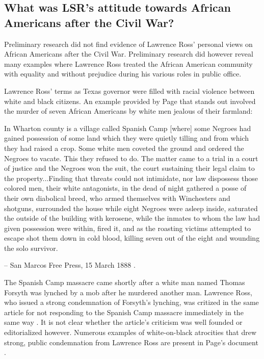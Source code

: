 \documentclass[12pt]{article}
\begin{document}
\newpage
\subsection{What was LSR's attitude towards African Americans after the Civil War?}
Preliminary research did not find evidence of Lawrence Ross' personal views on African Americans after the Civil War. Preliminary research did however reveal many examples where Lawrence Ross treated the African American community with equality and without prejudice during his various roles in public office. 

Lawrence Ross' terms as Texas governor were filled with racial violence between white and black citizens. An example provided by Page that stands out involved the murder of seven African Americans by white men jealous of their farmland:
\begin{displayquote}
In Wharton county is a village called Spanish Camp [where] some Negroes had gained possession of some land which they were quietly tilling and from which they had raised a crop. Some white men coveted the ground and ordered the Negroes to vacate.  This they refused to do. The matter came to a trial in a court of justice and the Negroes won the suit, the court sustaining their legal claim to the property...Finding that threats could not intimidate, nor law dispossess those colored men, their white antagonists, in the dead of night gathered a posse of their own diabolical breed, who armed themselves with Winchesters and shotguns, surrounded the house while eight Negroes were asleep inside, saturated the outside of the building with kerosene, while the inmates to whom the law had given possession were within, fired it, and as the roasting victims attempted to escape shot them down in cold blood, killing seven out of the eight and wounding the solo survivor.

-- San Marcos Free Press, 15 March 1888 \cite{sanmarcospress}.
\end{displayquote}

The Spanish Camp massacre came shortly after a white man named Thomas Forsyth was lynched by a mob after he murdered another man. Lawrence Ross, who issued a strong condemnation of Forsyth's lynching, was critized in the same article for not responding to the Spanish Camp massacre immediately in the same way \cite[pg. 97--98]{page}. It is not clear whether the article's criticism was well founded or editorialized however. Numerous examples of white-on-black atrocities that drew strong, public condemnation from Lawrence Ross are present in Page's document \cite[95--155, etc]{page}. 
\end{document}
